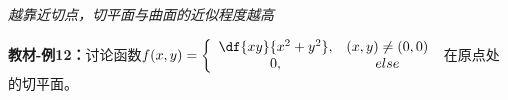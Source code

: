 \begin{center}
	\quad{}
	
	{\it 越靠近切点，切平面与曲面的近似程度越高}
\end{center}

{\bf 教材-例12：}讨论函数$f(x,y)=\left\{\begin{array}{cc}
	\df{xy}{x^2+y^2},& (x,y)\ne (0,0)\\
	0, & else
\end{array}\right.$
在原点处的切平面。

